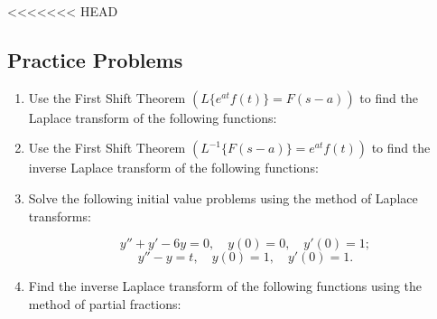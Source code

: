 \documentclass[a4paper, 10pt]{article}
\begin{document}
<<<<<<< HEAD
\subsection{Practice Problems}
\begin{enumerate}
  \item Use the First Shift Theorem \(\left( L \{ e^{at} f(t) \} = F(s - a) \right)\) to find the Laplace transform of the following functions:

  \item Use the First Shift Theorem \(\left( L^{-1} \{ F(s - a) \} = e^{at} f(t) \right)\) to find the inverse Laplace transform of the following functions:

  \item Solve the following initial value problems using the method of Laplace transforms:

        $$
          y'' + y' - 6y = 0 , \quad  y(0) = 0 , \quad  y'(0) = 1 ;
        $$
        $$
          y'' - y = t , \quad  y(0) = 1 , \quad  y'(0) = 1 .
        $$
  \item Find the inverse Laplace transform of the following functions using the method of partial fractions:

\end{enumerate}
\end{document}
